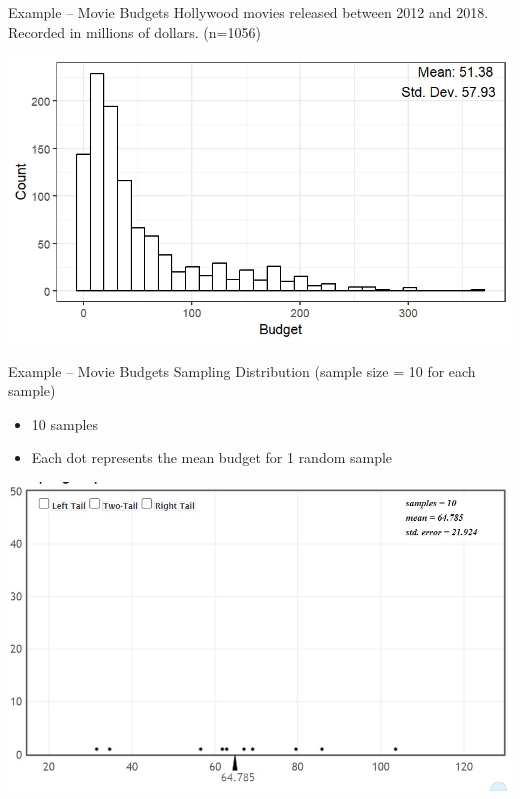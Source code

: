 \documentclass{beamer}
\begin{document}
\begin{frame}{Example -- Movie Budgets}
Hollywood movies released between 2012 and 2018. Recorded in millions of dollars. (n=1056)
\begin{center}
    \includegraphics[scale=.7]{img/MovieBudgets_pop_distr.jpeg}
\end{center}
\end{frame}

\begin{frame}{Example -- Movie Budgets}
Sampling Distribution (sample size = 10 for each sample)
\begin{itemize}
    \item 10 samples
    \item Each dot represents the mean budget for 1 random sample
\end{itemize}
\begin{center}
    \includegraphics[scale=.55]{img/budget_dotplot1.jpg}
\end{center}
\end{frame}
\end{document}
